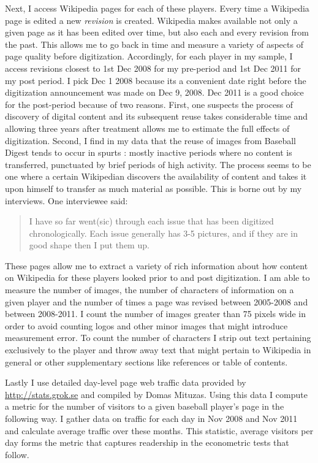 \documentclass[12pt]{article}
\begin{document}
Next, I access Wikipedia pages for each of these players. Every time a Wikipedia page is edited a new \emph{revision} is created. Wikipedia makes available not only a given page as it has been edited over time, but also each and every revision from the past. This allows me to go back in time and measure a variety of aspects of page quality before digitization. Accordingly, for each player in my sample, I access revisions closest to 1st Dec 2008 for my pre-period and 1st Dec 2011 for my post period. I pick Dec 1 2008 because its a convenient date right before the digitization announcement was made on Dec 9, 2008. Dec 2011 is a good choice for the post-period because of two reasons. First, one suspects the process of discovery of digital content and its subsequent reuse takes considerable time and allowing three years after treatment allows me to estimate the full effects of digitization. Second, I find in my data that the reuse of images from Baseball Digest tends to occur in spurts : mostly inactive periods where no content is transferred, punctuated by brief periods of high activity. The process seems to be one where a certain Wikipedian discovers the availability of content and takes it upon himself to transfer as much material as possible. This is borne out by my interviews. One interviewee said:

\begin{quotation}
I have so far went(sic) through each issue that has been digitized chronologically. Each issue generally has 3-5 pictures, and if they are in good shape then I put them up.
\end{quotation}

These pages allow me to extract a variety of rich information about how content on Wikipedia for these players looked prior to and post digitization. I am able to measure the number of images, the number of characters of information on a given player and the number of times a page was revised between 2005-2008 and between 2008-2011. I count the number of images greater than 75 pixels wide in order to avoid counting logos and other minor images that might introduce measurement error. To count the number of characters I strip out text pertaining exclusively to the player and throw away text that might pertain to Wikipedia in general or other supplementary sections like references or table of contents. 

Lastly I use detailed day-level page web traffic data provided by \url{http://stats.grok.se} and compiled by Domas Mituzas. Using this data I compute a metric for the number of visitors to a given baseball player's page in the following way. I gather data on traffic for each day in Nov 2008 and Nov 2011 and calculate average traffic over these months. This statistic, average visitors per day forms the metric that captures readership in the econometric tests that follow.
\end{document}

